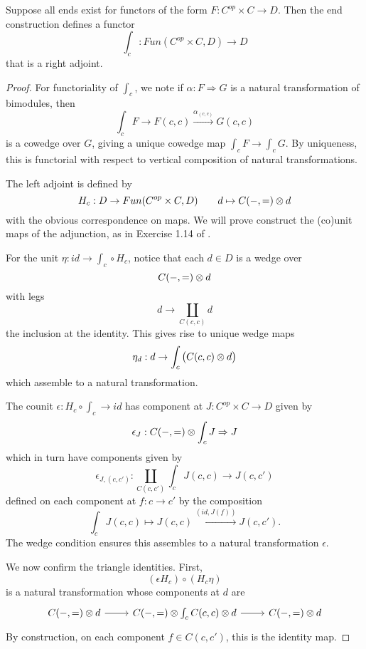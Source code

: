 \begin{lemma}\label{lem:fubini-adjunction}
    Suppose all ends exist for functors of the form $F:C^{op}\times C\rightarrow D$. Then the end construction defines a functor $$\int_c:Fun(C^{op}\times C,D)\rightarrow D$$ that is a right adjoint.
\end{lemma}
\begin{proof}
For functoriality of $\int_c$, we note if $\alpha:F\Rightarrow G$ is a natural transformation of bimodules, then $$\int_cF\rightarrow F(c,c)\xrightarrow[]{\alpha_{(c,c)}}G(c,c)$$ is a cowedge over $G$, giving a unique cowedge map $\int_cF\rightarrow \int_c G$. By uniqueness, this is functorial with respect to vertical composition of natural transformations.

The left adjoint  is defined by $$H_c:D\rightarrow Fun(C^{op}\times C,D) \qquad d\mapsto C(-,=)\otimes d$$
with the obvious correspondence on maps. We will prove construct the (co)unit maps of the adjunction, as in Exercise 1.14 of \cite{Fubini}.

For the unit $\eta:id\rightarrow \int_c\circ H_c$, notice that each $d\in D$ is a wedge over $$C(-,=)\otimes d$$ with legs $$d\rightarrow \coprod_{C(c,c)}d$$ the inclusion at the identity. This gives rise to unique wedge maps $$\eta_d:d\rightarrow \int_c\big(C(c,c)\otimes d\big)$$ which assemble to a natural transformation.

The counit $\epsilon: H_c\circ \int_c \rightarrow id$ has component at $J:C^{op}\times C\rightarrow D$ given by
$$\epsilon_J:C(-,=)\otimes\int_c J\Rightarrow J$$ which in turn have components given by
$$\epsilon_{J,(c,c')}:\coprod_{C(c,c')}\int_cJ(c,c)\rightarrow J(c,c')$$
defined on each component at $f:c\rightarrow c'$ by the composition $$\int_c J(c,c)\mapsto J(c,c)\xrightarrow[]{(id,J(f))} J(c,c').$$ The wedge condition ensures this assembles to a natural transformation $\epsilon.$

We now confirm the triangle identities. First,
$$(\epsilon H_c) \circ (H_c\eta)$$ is a natural transformation whose components at $d$ are
\[\begin{tikzcd}
{C(-,=)\tensor d} \arrow[r] & {C(-,=)\tensor \int_cC(c,c)\tensor d} \arrow[r] & {C(-,=)\tensor d}
\end{tikzcd}\]
By construction, on each component $f\in C(c,c')$, this is the identity map.


\end{proof}
